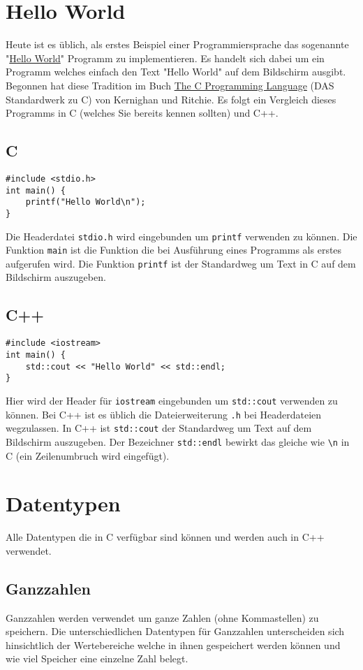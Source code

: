 \documentclass[11pt]{article}
\begin{document}
\section{Hello World}
\label{sec-3}
Heute ist es üblich, als erstes Beispiel einer Programmiersprache das
sogenannte "\href{https://de.wikipedia.org/wiki/Hallo-Welt-Programm}{Hello World}" Programm zu implementieren. Es handelt sich
dabei um ein Programm welches einfach den Text "Hello World" auf dem
Bildschirm ausgibt. Begonnen hat diese Tradition im Buch \href{https://de.wikipedia.org/wiki/The_C_Programming_Language}{The C
Programming Language} (DAS Standardwerk zu C) von Kernighan und
Ritchie. Es folgt ein Vergleich dieses Programms in C (welches Sie
bereits kennen sollten) und C++.
\subsection{C}
\label{sec-3-1}
\begin{verbatim}
#include <stdio.h>
int main() {
    printf("Hello World\n");
}
\end{verbatim}
Die Headerdatei \verb~stdio.h~ wird eingebunden um \verb~printf~ verwenden zu
können. Die Funktion \verb~main~ ist die Funktion die bei Ausführung eines
Programms als erstes aufgerufen wird. Die Funktion \verb~printf~ ist der
Standardweg um Text in C auf dem Bildschirm auszugeben.
\subsection{C++}
\label{sec-3-2}
\begin{verbatim}
#include <iostream>
int main() {
    std::cout << "Hello World" << std::endl;
}
\end{verbatim}
Hier wird der Header für \verb~iostream~ eingebunden um \verb~std::cout~
verwenden zu können. Bei C++ ist es üblich die Dateierweiterung \verb~.h~
bei Headerdateien wegzulassen. In C++ ist \verb~std::cout~ der Standardweg
um Text auf dem Bildschirm auszugeben. Der Bezeichner \verb~std::endl~
bewirkt das gleiche wie \verb~\n~ in C (ein Zeilenumbruch wird eingefügt).
\section{Datentypen}
\label{sec-4}
Alle Datentypen die in C verfügbar sind können und werden auch in C++
verwendet.
\subsection{Ganzzahlen}
\label{sec-4-1}
Ganzzahlen werden verwendet um ganze Zahlen (ohne Kommastellen) zu
speichern. Die unterschiedlichen Datentypen für Ganzzahlen
unterscheiden sich hinsichtlich der Wertebereiche welche in ihnen
gespeichert werden können und wie viel Speicher eine einzelne Zahl
belegt.
\end{document}
